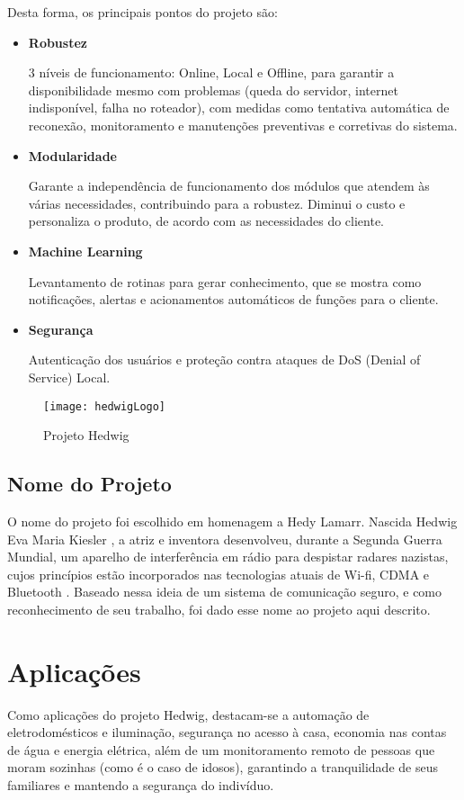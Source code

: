Desta forma, os principais pontos do projeto são:

\begin{itemize}
\item \textbf{Robustez}

3 níveis de funcionamento: Online, Local e Offline, para garantir a disponibilidade mesmo com problemas (queda do servidor, internet indisponível, falha no roteador), com medidas como tentativa automática de reconexão, monitoramento e manutenções preventivas e corretivas do sistema.

\item \textbf{Modularidade}

Garante a independência de funcionamento dos módulos que atendem às várias necessidades, contribuindo para a robustez. Diminui o custo e personaliza o produto, de acordo com as necessidades do cliente.

\item \textbf{Machine Learning}

Levantamento de rotinas para gerar conhecimento, que se mostra como notificações, alertas e acionamentos automáticos de funções para o cliente.

\item \textbf{Segurança}

Autenticação dos usuários e proteção contra ataques de DoS (Denial of Service) Local.
\end{itemize}


\begin{figure}[H]
	\centering
	\caption{Projeto Hedwig}
  \texttt{[image: hedwigLogo]}
\label{fig:hedwigLogo}
\end{figure}

\subsection{Nome do Projeto}
O nome do projeto foi escolhido em homenagem a Hedy Lamarr. Nascida Hedwig Eva Maria Kiesler \cite{shearer}, a atriz e inventora desenvolveu, durante a Segunda Guerra Mundial, um aparelho de interferência em rádio para despistar radares nazistas, cujos princípios estão incorporados nas tecnologias atuais de Wi-fi, CDMA e Bluetooth \cite{electronicFrontier}. Baseado nessa ideia de um sistema de comunicação seguro, e como reconhecimento de seu trabalho, foi dado esse nome ao projeto aqui descrito.

\section{Aplicações}
Como aplicações do projeto Hedwig, destacam-se a automação de eletrodomésticos e iluminação, segurança no acesso à casa, economia nas contas de água e energia elétrica, além de um monitoramento remoto de pessoas que moram sozinhas (como é o caso de idosos), garantindo a tranquilidade de seus familiares e mantendo a segurança do indivíduo.


